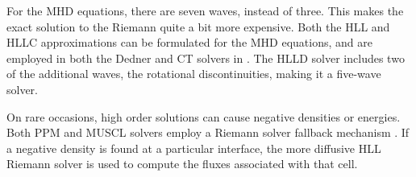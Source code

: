 For the MHD equations, there are seven waves, instead of three.  This makes the
exact solution to the Riemann quite a bit more expensive.  Both the HLL and HLLC
approximations can be formulated for the MHD equations, and are employed in both
the Dedner and CT solvers in \enzo.  The HLLD
solver includes two of the additional waves, the rotational discontinuities,
making it a five-wave solver.

On rare occasions, high order
solutions can cause negative densities or energies.  Both PPM and MUSCL solvers employ a Riemann
solver fallback mechanism \citep{Lemaster09}.  If a negative density is found at
a particular interface, the more diffusive HLL Riemann solver is used to compute the fluxes associated with that cell.



